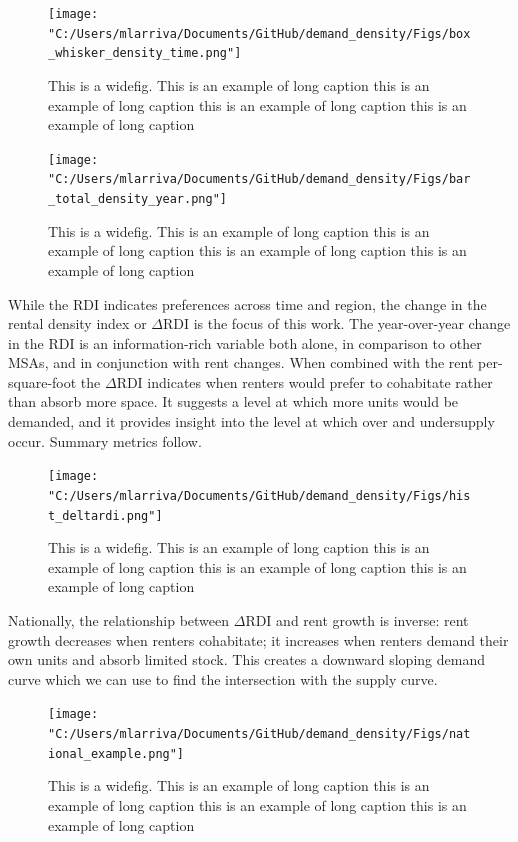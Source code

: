 \documentclass[sn-mathphys-num]{sn-jnl}%
\theoremstyle{thmstyleone}%
\theoremstyle{thmstyletwo}%
\theoremstyle{thmstylethree}%
\begin{document}
\begin{figure}[H]
	\centering
	\texttt{[image: "C:/Users/mlarriva/Documents/GitHub/demand\_density/Figs/box\_whisker\_density\_time.png"]}
	\caption{This is a widefig. This is an example of long caption this is an example of long caption  this is an example of long caption this is an example of long caption}\label{fig1}
\end{figure}

\begin{figure}[H]
	\centering
	\texttt{[image: "C:/Users/mlarriva/Documents/GitHub/demand\_density/Figs/bar\_total\_density\_year.png"]}
	\caption{This is a widefig. This is an example of long caption this is an example of long caption  this is an example of long caption this is an example of long caption}\label{fig2}
\end{figure}

While the RDI indicates preferences across time and region, the change in the rental density index or $\Delta\text{RDI}$ is the focus of this work. The year-over-year change in the RDI is an information-rich variable both alone, in comparison to other MSAs, and in conjunction with rent changes. When combined with the rent per-square-foot the $\Delta\text{RDI}$ indicates when renters would prefer to cohabitate rather than absorb more space. It suggests a level at which more units would be demanded, and it provides insight into the level at which over and undersupply occur. 
Summary metrics follow.

\begin{figure}[H]
	\centering
	\texttt{[image: "C:/Users/mlarriva/Documents/GitHub/demand\_density/Figs/hist\_deltardi.png"]}
	\caption{This is a widefig. This is an example of long caption this is an example of long caption  this is an example of long caption this is an example of long caption}\label{fig3}
\end{figure}

Nationally, the relationship between $\Delta\text{RDI}$ and rent growth is inverse: rent growth decreases when renters cohabitate; it increases when renters demand their own units and absorb limited stock. This creates a downward sloping demand curve which we can use to find the intersection with the supply curve. 

\begin{figure}[H]
	\centering
	\texttt{[image: "C:/Users/mlarriva/Documents/GitHub/demand\_density/Figs/national\_example.png"]}
	\caption{This is a widefig. This is an example of long caption this is an example of long caption  this is an example of long caption this is an example of long caption}\label{fig4}
\end{figure}
\end{document}
